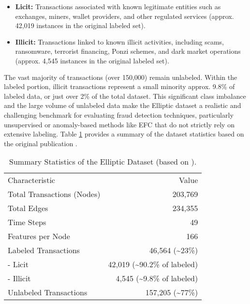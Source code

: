 \documentclass[12pt]{article}
\begin{document}
\begin{itemize}
    \item \textbf{Licit:} Transactions associated with known legitimate entities such as exchanges, miners, wallet providers,
      and other regulated services (approx. 42,019 instances in the original labeled set).
    \item \textbf{Illicit:} Transactions linked to known illicit activities, including scams, ransomware, terrorist financing,
      Ponzi schemes, and dark market operations (approx. 4,545 instances in the original labeled set).
\end{itemize}

The vast majority of transactions (over 150,000) remain unlabeled. Within the labeled portion, illicit transactions represent
a small minority approx. 9.8\% of labeled data, or just over 2\% of the total dataset. This significant class imbalance
and the large volume of unlabeled data make the Elliptic dataset a realistic and challenging benchmark for evaluating fraud
detection techniques, particularly unsupervised or anomaly-based methods like EFC that do not strictly rely on extensive
labeling. Table \ref{tab:dataset_summary} provides a summary of the dataset statistics based on the original publication
\cite{weber2019antimoneylaunderingbitcoinexperimenting}.

\begin{table}[htbp]
  \centering
  \caption{Summary Statistics of the Elliptic Dataset (based on \cite{weber2019antimoneylaunderingbitcoinexperimenting}).}
  \label{tab:dataset_summary}
  \begin{tabular}{lr}
    \hline
    Characteristic        & Value \\
    Total Transactions (Nodes) & 203,769 \\
    Total Edges           & 234,355 \\
    Time Steps            & 49 \\
    Features per Node     & 166 \\
    Labeled Transactions  & 46,564 (\textasciitilde23\%) \\
    \quad - Licit         & 42,019 (\textasciitilde90.2\% of labeled) \\
    \quad - Illicit       & 4,545 (\textasciitilde9.8\% of labeled) \\
    Unlabeled Transactions & 157,205 (\textasciitilde77\%) \\
  \end{tabular}
\end{table}
\end{document}
